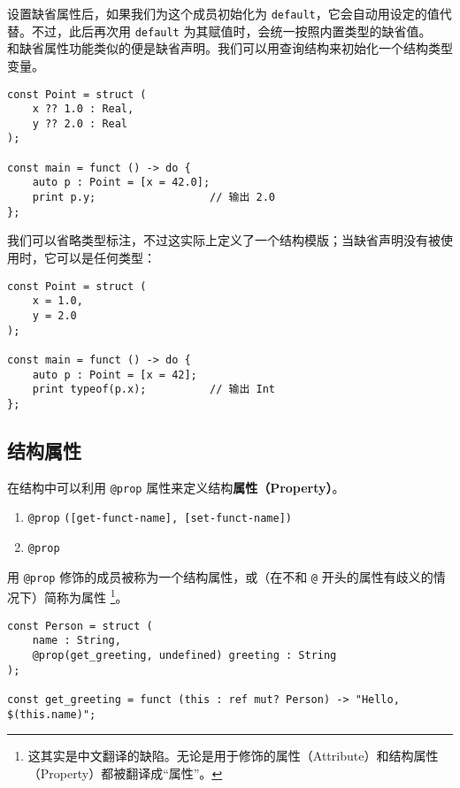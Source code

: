 设置缺省属性后，如果我们为这个成员初始化为 \lstinline!default!，它会自动用设定的值代替。不过，此后再次用 \lstinline!default! 为其赋值时，会统一按照内置类型的缺省值。 \\

和缺省属性功能类似的便是缺省声明。我们可以用查询结构来初始化一个结构类型变量。

\begin{minipage}[c]{0.95\textwidth}
\vspace{1.0em}
\begin{lstlisting}
const Point = struct (
    x ?? 1.0 : Real,
    y ?? 2.0 : Real
);

const main = funct () -> do {
    auto p : Point = [x = 42.0];
    print p.y;					// 输出 2.0 
};
\end{lstlisting}
\end{minipage}


我们可以省略类型标注，不过这实际上定义了一个结构模版；当缺省声明没有被使用时，它可以是任何类型：

\begin{lstlisting}
const Point = struct (
    x = 1.0,
    y = 2.0
);

const main = funct () -> do {
    auto p : Point = [x = 42];
    print typeof(p.x);			// 输出 Int
};
\end{lstlisting}


\subsection{结构属性}

在结构中可以利用 \lstinline!@prop! 属性来定义结构\textbf{属性（Property）}。

\begin{grammar} \label{grm:structure-property}
\begin{enumerate}
	\item \lstinline!@prop! \texttt{([get-funct-name], [set-funct-name])}
	\item \lstinline!@prop!
\end{enumerate}
\end{grammar}

用 \lstinline!@prop! 修饰的成员被称为一个结构属性，或（在不和 \lstinline!@! 开头的属性有歧义的情况下）简称为属性 \footnote{这其实是中文翻译的缺陷。无论是用于修饰的属性（Attribute）和结构属性（Property）都被翻译成“属性”。}。

\begin{lstlisting}
const Person = struct (
	name : String,
	@prop(get_greeting, undefined) greeting : String
);

const get_greeting = funct (this : ref mut? Person) -> "Hello, $(this.name)";
\end{lstlisting}

